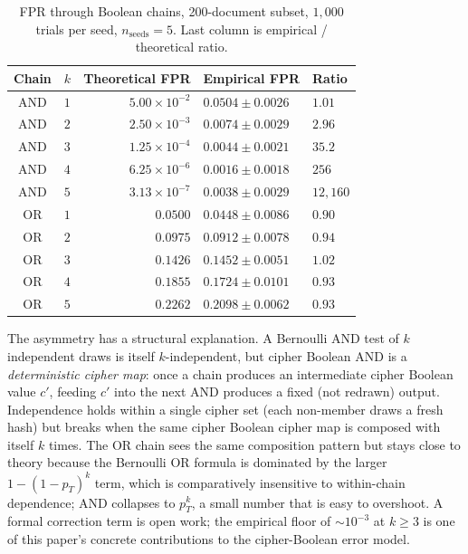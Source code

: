 \documentclass[11pt]{article}
\theoremstyle{definition}
\theoremstyle{plain}
\theoremstyle{remark}
\begin{document}
\begin{table}[ht]
\centering
\small
\caption{FPR through Boolean chains, 200-document subset,
$1{,}000$ trials per seed, $n_\text{seeds} = 5$.
Last column is empirical / theoretical ratio.}
\label{tab:fpr-compounding}
\begin{tabular}{@{}clrll@{}}
\toprule
Chain & $k$ & Theoretical FPR & Empirical FPR & Ratio \\
\midrule
AND & $1$ & $5.00 \times 10^{-2}$ & $0.0504 \pm 0.0026$ & $1.01$ \\
AND & $2$ & $2.50 \times 10^{-3}$ & $0.0074 \pm 0.0029$ & $2.96$ \\
AND & $3$ & $1.25 \times 10^{-4}$ & $0.0044 \pm 0.0021$ & $35.2$ \\
AND & $4$ & $6.25 \times 10^{-6}$ & $0.0016 \pm 0.0018$ & $256$ \\
AND & $5$ & $3.13 \times 10^{-7}$ & $0.0038 \pm 0.0029$ & $12{,}160$ \\
\midrule
OR & $1$ & $0.0500$ & $0.0448 \pm 0.0086$ & $0.90$ \\
OR & $2$ & $0.0975$ & $0.0912 \pm 0.0078$ & $0.94$ \\
OR & $3$ & $0.1426$ & $0.1452 \pm 0.0051$ & $1.02$ \\
OR & $4$ & $0.1855$ & $0.1724 \pm 0.0101$ & $0.93$ \\
OR & $5$ & $0.2262$ & $0.2098 \pm 0.0062$ & $0.93$ \\
\bottomrule
\end{tabular}
\end{table}

The asymmetry has a structural explanation.
A Bernoulli AND test of $k$ independent draws is itself
$k$-independent, but cipher Boolean AND is a \emph{deterministic
cipher map}: once a chain produces an intermediate cipher Boolean
value $c'$, feeding $c'$ into the next AND produces a fixed (not
redrawn) output.
Independence holds within a single cipher set (each non-member
draws a fresh hash) but breaks when the same cipher Boolean cipher
map is composed with itself $k$ times.
The OR chain sees the same composition pattern but stays close to
theory because the Bernoulli OR formula is dominated by the larger
$1 - (1 - p_T)^k$ term, which is comparatively insensitive to
within-chain dependence; AND collapses to $p_T^k$, a small number
that is easy to overshoot.
A formal correction term is open work; the empirical floor of
$\sim 10^{-3}$ at $k \geq 3$ is one of this paper's concrete
contributions to the cipher-Boolean error model.
\end{document}
